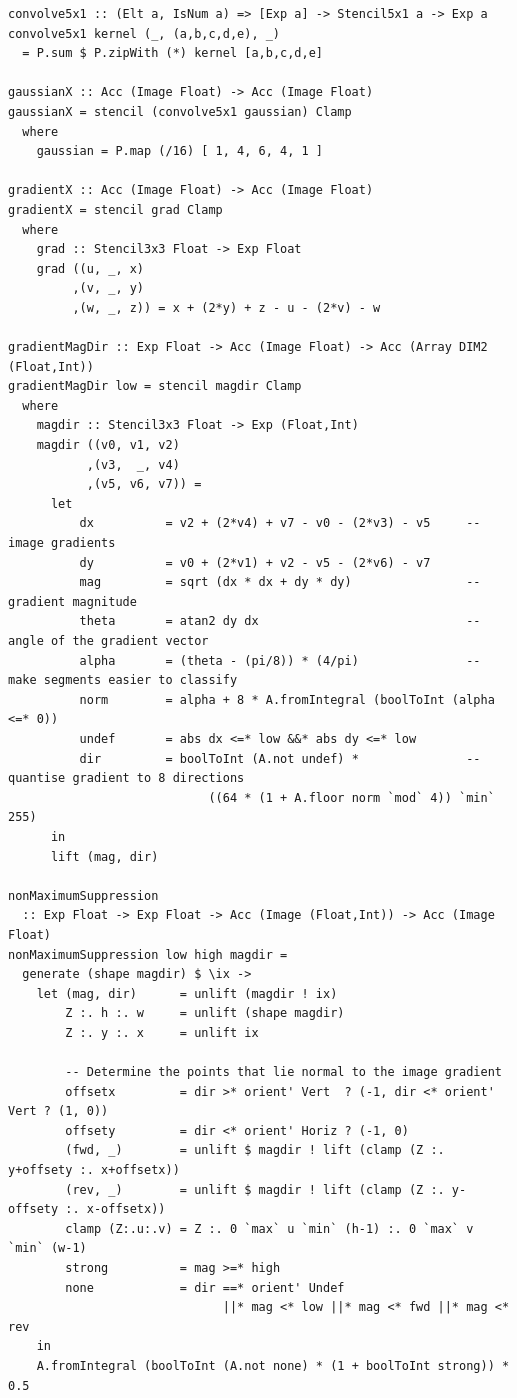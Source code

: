 \begin{lstlisting}[style=haskell_float
    ,label=lst:canny-kernels
    ,caption={The data-parallel kernels of the Canny edge detection algorithm}]
convolve5x1 :: (Elt a, IsNum a) => [Exp a] -> Stencil5x1 a -> Exp a
convolve5x1 kernel (_, (a,b,c,d,e), _)
  = P.sum $ P.zipWith (*) kernel [a,b,c,d,e]

gaussianX :: Acc (Image Float) -> Acc (Image Float)
gaussianX = stencil (convolve5x1 gaussian) Clamp
  where
    gaussian = P.map (/16) [ 1, 4, 6, 4, 1 ]

gradientX :: Acc (Image Float) -> Acc (Image Float)
gradientX = stencil grad Clamp
  where
    grad :: Stencil3x3 Float -> Exp Float
    grad ((u, _, x)
         ,(v, _, y)
         ,(w, _, z)) = x + (2*y) + z - u - (2*v) - w

gradientMagDir :: Exp Float -> Acc (Image Float) -> Acc (Array DIM2 (Float,Int))
gradientMagDir low = stencil magdir Clamp
  where
    magdir :: Stencil3x3 Float -> Exp (Float,Int)
    magdir ((v0, v1, v2)
           ,(v3,  _, v4)
           ,(v5, v6, v7)) =
      let
          dx          = v2 + (2*v4) + v7 - v0 - (2*v3) - v5     -- image gradients
          dy          = v0 + (2*v1) + v2 - v5 - (2*v6) - v7
          mag         = sqrt (dx * dx + dy * dy)                -- gradient magnitude
          theta       = atan2 dy dx                             -- angle of the gradient vector
          alpha       = (theta - (pi/8)) * (4/pi)               -- make segments easier to classify
          norm        = alpha + 8 * A.fromIntegral (boolToInt (alpha <=* 0))
          undef       = abs dx <=* low &&* abs dy <=* low
          dir         = boolToInt (A.not undef) *               -- quantise gradient to 8 directions
                            ((64 * (1 + A.floor norm `mod` 4)) `min` 255)
      in
      lift (mag, dir)

nonMaximumSuppression
  :: Exp Float -> Exp Float -> Acc (Image (Float,Int)) -> Acc (Image Float)
nonMaximumSuppression low high magdir =
  generate (shape magdir) $ \ix ->
    let (mag, dir)      = unlift (magdir ! ix)
        Z :. h :. w     = unlift (shape magdir)
        Z :. y :. x     = unlift ix

        -- Determine the points that lie normal to the image gradient
        offsetx         = dir >* orient' Vert  ? (-1, dir <* orient' Vert ? (1, 0))
        offsety         = dir <* orient' Horiz ? (-1, 0)
        (fwd, _)        = unlift $ magdir ! lift (clamp (Z :. y+offsety :. x+offsetx))
        (rev, _)        = unlift $ magdir ! lift (clamp (Z :. y-offsety :. x-offsetx))
        clamp (Z:.u:.v) = Z :. 0 `max` u `min` (h-1) :. 0 `max` v `min` (w-1)
        strong          = mag >=* high
        none            = dir ==* orient' Undef
                              ||* mag <* low ||* mag <* fwd ||* mag <* rev
    in
    A.fromIntegral (boolToInt (A.not none) * (1 + boolToInt strong)) * 0.5


\end{lstlisting}
